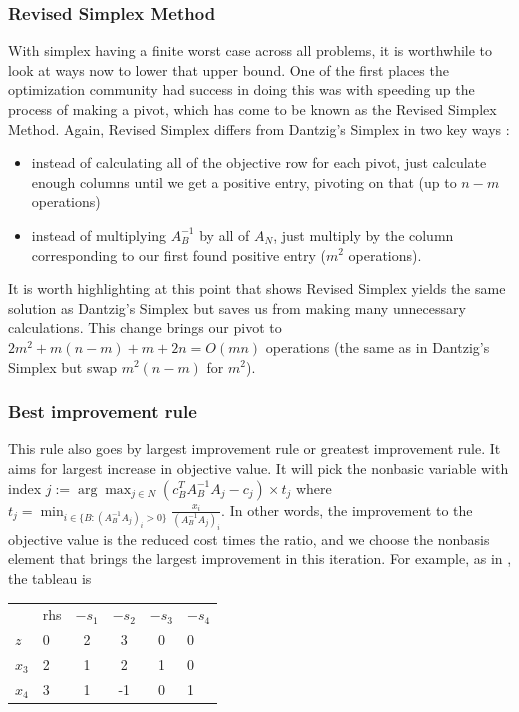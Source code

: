 \documentclass[11pt]{article}
\begin{document}
\subsubsection{Revised Simplex Method}
With simplex having a finite worst case across all problems, it is worthwhile to look at ways now to lower that upper bound. One of the first places the optimization community had success in doing this was with speeding up the process of making a pivot, which has come to be known as the Revised Simplex Method. Again, Revised Simplex differs from Dantzig's Simplex in two key ways \cite{revised}:
\begin{itemize}
	\item instead of calculating all of the objective row for each pivot, just calculate enough columns until we get a positive entry, pivoting on that (up to $n-m$ operations)
	\item instead of multiplying $A_B^{-1}$ by all of $A_N$, just multiply by the column corresponding to our first found positive entry ($m^2$ operations).
\end{itemize}
It is worth highlighting at this point that \cite{revised} shows Revised Simplex yields the same solution as Dantzig's Simplex but saves us from making many unnecessary calculations. This change brings our pivot to $2 m^2 + m (n - m) + m + 2 n = O(mn)$ operations (the same as in Dantzig's Simplex but swap $m^2(n-m)$ for $m^2$).


\subsubsection{Best improvement rule}
This rule also goes by largest improvement rule or greatest improvement rule. It aims for largest increase in objective value. It will pick the nonbasic variable with index $j := \arg \max_{j\in N}(c_B^T A_B^{-1} A_j - c_j)\times t_j$ where $t_j = \min_{i \in \{B:(A_B^{-1}A_j)_{i} >0\}} \frac{x_i}{(A_B^{-1}A_j)_{i}}$. In other words, the improvement to the objective value is the reduced cost times the ratio, and we choose the nonbasis element that brings the largest improvement in this iteration. For example, as in \cite{largest}, the tableau is
\begin{table}[h]
\centering
\begin{tabular}{cccccc}
                        & rhs                    & $-s_1$ & $-s_2$ & $-s_3$ & $-s_4$                    \\ \cline{2-6} 
\multicolumn{1}{l|}{$z$}  & \multicolumn{1}{l|}{0} & 2   & 3   & 0   & \multicolumn{1}{l|}{0} \\ \cline{2-6} 
\multicolumn{1}{l|}{$x_3$} & \multicolumn{1}{l|}{2} & 1   & 2   & 1   & \multicolumn{1}{l|}{0} \\
\multicolumn{1}{l|}{$x_4$} & \multicolumn{1}{l|}{3} & 1   & -1  & 0   & \multicolumn{1}{l|}{1} \\ \cline{2-6} 
\end{tabular}
\end{table}
\end{document}
